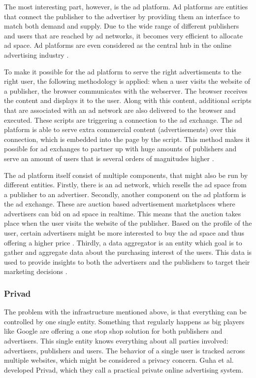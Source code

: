 The most interesting part, however, is the ad platform. Ad platforms are entities that connect the publisher to the advertiser by providing them an interface to match both demand and supply. Due to the wide range of different publishers and users that are reached by ad networks, it becomes very efficient to allocate ad space. Ad platforms are even considered as the central hub in the online advertising industry \cite{estrada2017online}.

To make it possible for the ad platform to serve the right advertisments to the right user, the following methodology is applied: when a user visits the website of a publisher, the browser communicates with the webserver. The browser receives the content and displays it to the user. Along with this content, additional scripts that are associated with an ad network are also delivered to the browser and executed. These scripts are triggering a connection to the ad exchange. The ad platform is able to serve extra commercial content (advertisements) over this connection, which is embedded into the page by the script. This method makes it possible for ad exchanges to partner up with huge amounts of publishers and serve an amount of users that is several orders of magnitudes higher \cite{estrada2017online}.

The ad platform itself consist of multiple components, that might also be run by different entities. Firstly, there is an ad network, which resells the ad space from a publisher to an advertiser. Secondly, another component on the ad platform is the ad exchange. These are auction based advertisement marketplaces where advertisers can bid on ad space in realtime. This means that the auction takes place when the user visits the website of the publisher. Based on the profile of the user, certain advertisers might be more interested to buy the ad space and thus offering a higher price \cite{estrada2017online}. Thirdly, a data aggregator is an entity which goal is to gather and aggregate data about the purchasing interest of the users. This data is used to provide insights to both the advertisers and the publishers to target their marketing decisions \cite{estrada2017online}.

\subsubsection{Privad}
The problem with the infrastructure mentioned above, is that everything can be controlled by one single entity. Something that regularly happens as big players like Google are offering a one stop shop solution for both publishers and advertisers. This single entity knows everything about all parties involved: advertisers, publishers and users. The behavior of a single user is tracked across multiple websites, which might be considered a privacy concern. Guha et al. \cite{guha2011privad} developed Privad, which they call a practical private online advertising system. 

